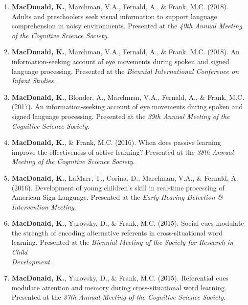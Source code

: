 \documentclass[10pt]{article}
\begin{document}
\begin{enumerate}

        \item {\bf MacDonald, K.}, Marchman, V.A., Fernald, A., \& Frank, M.C. (2018). Adults and preschoolers 
                seek visual information to support language comprehension in noisy environments. 
                Presented at the \emph{40th Annual Meeting of the Cognitive Science Society.}

        \item {\bf MacDonald, K.}, Marchman, V.A., Fernald, A., \& Frank, M.C. (2018). An information-seeking 
                account of eye movements during spoken and signed language processing. Presented at the \emph{Biennial 
                International Conference on Infant Studies.}

        \item {\bf MacDonald, K.}, Blonder, A., Marchman, V.A., Fernald, A., \& Frank, M.C. (2017). An information-seeking 
                account of eye movements during spoken and signed language processing. Presented at the \emph{39th Annual 
                Meeting of the Cognitive Science Society.}

        \item {\bf MacDonald, K.}, \& Frank, M.C. (2016). When does passive learning improve the effectiveness of active 
                learning? Presented at the \emph{38th Annual Meeting of the Cognitive Science Society.}
        
        \item {\bf MacDonald, K.}, LaMarr, T., Corina, D., Marchman, V.A., \& Fernald, A. (2016). 
                Development of young children’s skill in real-time processing of American Sign Language. Presented at the 
                \emph{Early Hearing Detection \& Intervention Meeting}.

        \item {\bf MacDonald, K.}, Yurovsky, D., \& Frank, M.C. (2015). Social cues modulate the strength of encoding 
                alternative referents in cross-situational word learning. Presented at the \emph{Biennial Meeting of 
                the Society for Research in Child \\ Development.}
        
        \item {\bf MacDonald, K.}, Yurovsky, D., \& Frank, M.C. (2015). Referential cues modulate attention and memory 
                during cross-situational word learning. Presented at the \emph{37th Annual Meeting of the Cognitive 
                Science Society.}
         

\end{enumerate}
\end{document}
